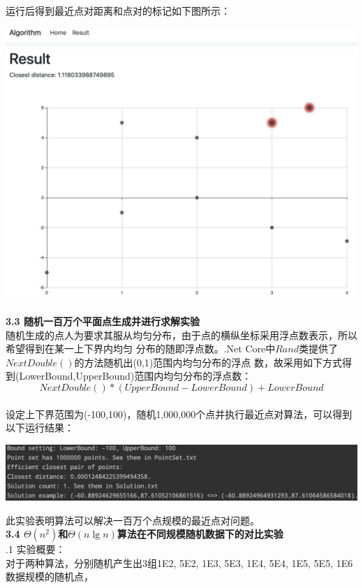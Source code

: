 \documentclass[a4paper]{article}
\begin{document}
\begin{enumerate}
\begin{center}
  \end{center}
  运行后得到最近点对距离和点对的标记如下图所示：
  \bigskip
  \begin{center}
    \includegraphics[scale=0.3]{Pictures/cpop2.png}
  \end{center}
  \medskip
  \textbf{3.3 随机一百万个平面点生成并进行求解实验}\\
  \medskip
  随机生成的点人为要求其服从均匀分布，由于点的横纵坐标采用浮点数表示，所以希望得到在某一上下界内均匀
  分布的随即浮点数。.Net Core中$Rand$类提供了$NextDouble()$的方法随机出(0,1)范围内均匀分布的浮点
  数，故采用如下方式得到(LowerBound,UpperBound)范围内均匀分布的浮点数：
  $$NextDouble()*(UpperBound-LowerBound)+LowerBound$$\\
  设定上下界范围为(-100,100)，随机1,000,000个点并执行最近点对算法，可以得到以下运行结果：
  \bigskip
  \begin{center}
    \includegraphics[scale=0.4]{Pictures/log.png}
  \end{center}
  此实验表明算法可以解决一百万个点规模的最近点对问题。\\
  \medskip
  \textbf{3.4 $\Theta(n^2)$和$\Theta(n\lg n)$算法在不同规模随机数据下的对比实验}\\
  .1 实验概要：\\
  对于两种算法，分别随机产生出3组1E2, 5E2, 1E3, 5E3, 1E4, 5E4, 1E5, 5E5, 1E6数据规模的随机点，

\end{enumerate}
\end{document}
